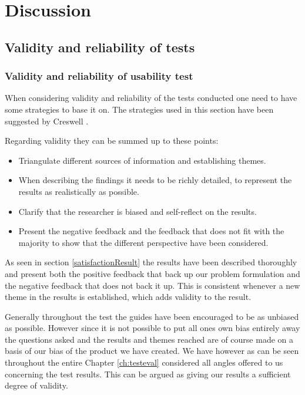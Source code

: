 \chapter{Discussion}\label{ch:discussion}

\section{Validity and reliability of tests}

\subsection{Validity and reliability of usability test}
When considering validity and reliability of the tests conducted one need to have some strategies to base it on. The strategies used in this section have been suggested by Creswell \citep{Creswell}.

Regarding validity they can be summed up to these points:
\begin{itemize}
\item Triangulate different sources of information and establishing themes.
\item When describing the findings it needs to be richly detailed, to represent the results as realistically as possible.
\item Clarify that the researcher is biased and self-reflect on the results.
\item Present the negative feedback and the feedback that does not fit with the majority to show that the different perspective have been considered.
\end{itemize}

As seen in section \ref{satisfactionResult} the results have been described thoroughly and present both the positive feedback that back up our problem formulation and the negative feedback that does not back it up. This is consistent whenever a new theme in the results is established, which adds validity to the result. 

Generally throughout the test the guides have been encouraged to be as unbiased as possible. However since it is not possible to put all ones own bias entirely away the questions asked and the results and themes reached are of course made on a basis of our bias of the product we have created. We have however as can be seen throughout the entire Chapter \ref{ch:testeval} considered all angles offered to us concerning the test results. This can be argued as giving our results a sufficient degree of validity. 

